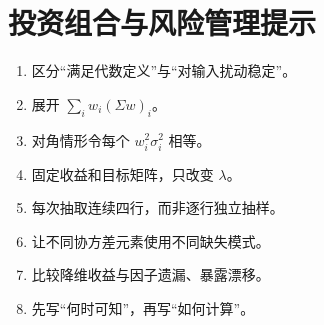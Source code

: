 \chapter{投资组合与风险管理提示}
\begin{enumerate}[leftmargin=*]
  \item 区分“满足代数定义”与“对输入扰动稳定”。
  \item 展开 $\sum_iw_i(\Sigma w)_i$。
  \item 对角情形令每个 $w_i^2\sigma_i^2$ 相等。
  \item 固定收益和目标矩阵，只改变 $\lambda$。
  \item 每次抽取连续四行，而非逐行独立抽样。
  \item 让不同协方差元素使用不同缺失模式。
  \item 比较降维收益与因子遗漏、暴露漂移。
  \item 先写“何时可知”，再写“如何计算”。
\end{enumerate}
